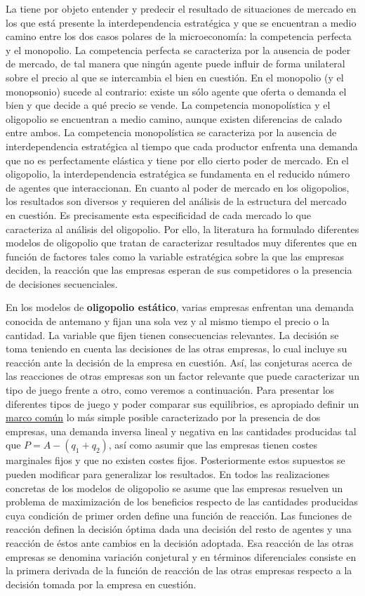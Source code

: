 \documentclass{nuevotema}
\begin{document}
La  tiene por objeto entender y predecir el resultado de situaciones de mercado en los que está presente la interdependencia estratégica y que se encuentran a medio camino entre los dos casos polares de la microeconomía: la competencia perfecta y el monopolio. La competencia perfecta se caracteriza por la ausencia de poder de mercado, de tal manera que ningún agente puede influir de forma unilateral sobre el precio al que se intercambia el bien en cuestión. En el monopolio (y el monopsonio) sucede al contrario: existe un sólo agente que oferta o demanda el bien y que decide a qué precio se vende. La competencia monopolística y el oligopolio se encuentran a medio camino, aunque existen diferencias de calado entre ambos. La competencia monopolística se caracteriza por la ausencia de interdependencia estratégica al tiempo que cada productor enfrenta una demanda que no es perfectamente elástica y tiene por ello cierto poder de mercado. En el oligopolio, la interdependencia estratégica se fundamenta en el reducido número de agentes que interaccionan. En cuanto al poder de mercado en los oligopolios, los resultados son diversos y requieren del análisis de la estructura del mercado en cuestión. Es precisamente esta especificidad de cada mercado lo que caracteriza al análisis del oligopolio. Por ello, la literatura ha formulado diferentes modelos de oligopolio que tratan de caracterizar resultados muy diferentes que en función de factores tales como la variable estratégica sobre la que las empresas deciden, la reacción que las empresas esperan de sus competidores o la presencia de decisiones secuenciales. 

En los modelos de \textbf{oligopolio estático}, varias empresas enfrentan una demanda conocida de antemano y fijan una sola vez y al mismo tiempo el precio o la cantidad. La variable que fijen tienen consecuencias relevantes. La decisión se toma teniendo en cuenta las decisiones de las otras empresas, lo cual incluye su reacción ante la decisión de la empresa en cuestión. Así, las conjeturas acerca de las reacciones de otras empresas son un factor relevante que puede caracterizar un tipo de juego frente a otro, como veremos a continuación. Para presentar los diferentes tipos de juego y poder comparar sus equilibrios, es apropiado definir un \underline{marco común} lo más simple posible caracterizado por la presencia de dos empresas, una demanda inversa lineal y negativa en las cantidades producidas tal que $P = A - (q_1 + q_2)$, así como asumir que las empresas tienen costes marginales fijos y que no existen costes fijos. Posteriormente estos supuestos se pueden modificar para generalizar los resultados. En todos las realizaciones concretas de los modelos de oligopolio se asume que las empresas resuelven un problema de maximización de los beneficios respecto de las cantidades producidas cuya condición de primer orden define una función de reacción. Las funciones de reacción definen la decisión óptima dada una decisión del resto de agentes y una reacción de éstos ante cambios en la decisión adoptada. Esa reacción de las otras empresas se denomina variación conjetural y en términos diferenciales consiste en la primera derivada de la función de reacción de las otras empresas respecto a la decisión tomada por la empresa en cuestión.
\end{document}
